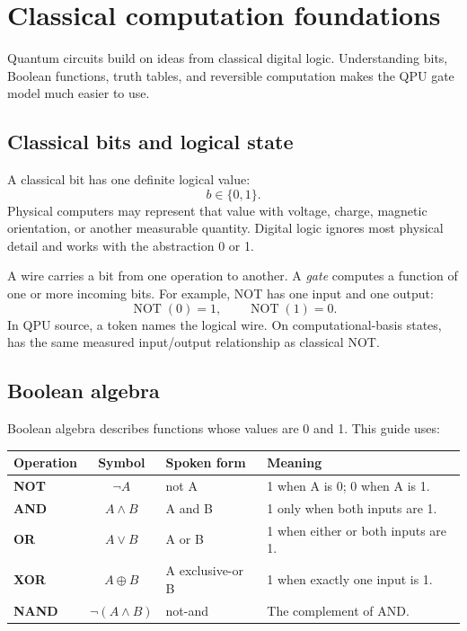 \section{Classical computation foundations}

Quantum circuits build on ideas from classical digital logic. Understanding
bits, Boolean functions, truth tables, and reversible computation makes the
QPU gate model much easier to use.

\subsection{Classical bits and logical state}

A classical bit has one definite logical value:
\[
b\in\{0,1\}.
\]
Physical computers may represent that value with voltage, charge, magnetic
orientation, or another measurable quantity. Digital logic ignores most
physical detail and works with the abstraction 0 or 1.

A wire carries a bit from one operation to another. A \emph{gate} computes a
function of one or more incoming bits. For example, NOT has one input and one
output:
\[
\operatorname{NOT}(0)=1,\qquad \operatorname{NOT}(1)=0.
\]
In QPU source, a token names the logical wire. On computational-basis states,
 has the same measured input/output relationship as
classical NOT.

\subsection{Boolean algebra}

Boolean algebra describes functions whose values are 0 and 1. This guide uses:
\begin{center}
\begin{tabularx}{\textwidth}{>{\bfseries}l c l X}
\toprule
Operation & Symbol & Spoken form & Meaning\\
\midrule
NOT & $\neg A$ & not A & 1 when A is 0; 0 when A is 1.\\
AND & $A\land B$ & A and B & 1 only when both inputs are 1.\\
OR & $A\lor B$ & A or B & 1 when either or both inputs are 1.\\
XOR & $A\oplus B$ & A exclusive-or B & 1 when exactly one input is 1.\\
NAND & $\neg(A\land B)$ & not-and & The complement of AND.\\
\bottomrule
\end{tabularx}
\end{center}

